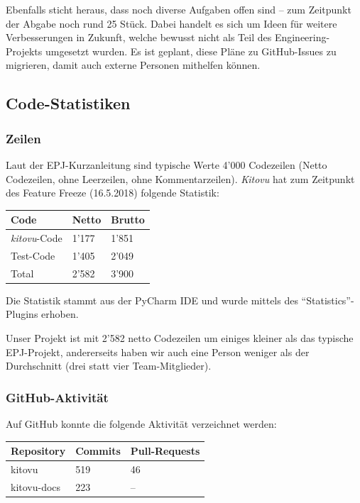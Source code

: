 \documentclass[a4paper]{article}
\begin{document}
Ebenfalls sticht heraus, dass noch diverse Aufgaben offen sind -- zum Zeitpunkt
der Abgabe noch rund 25 Stück. Dabei handelt es sich um Ideen für weitere
Verbesserungen in Zukunft, welche bewusst nicht als Teil des
Engineering-Projekts umgesetzt wurden. Es ist geplant, diese Pläne zu
GitHub-Issues zu migrieren, damit auch externe Personen mithelfen können.

\subsection{Code-Statistiken}

\subsubsection{Zeilen}

Laut der EPJ-Kurzanleitung sind typische Werte 4'000 Codezeilen (Netto Codezeilen, ohne Leerzeilen, ohne Kommentarzeilen). \emph{Kitovu} hat zum Zeitpunkt des Feature Freeze (16.5.2018) folgende Statistik:

\begin{tabulary}{\linewidth}{lll}
  \toprule
  \textbf{Code} & \textbf{Netto} & \textbf{Brutto} \\
  \midrule
  \emph{kitovu}-Code & 1'177 & 1'851 \\
  Test-Code & 1'405 & 2'049 \\
  \midrule
  Total & 2'582 & 3'900 \\
  \bottomrule
\end{tabulary}

Die Statistik stammt aus der PyCharm IDE und wurde mittels des ``Statistics''-Plugins erhoben.

Unser Projekt ist mit 2'582 netto Codezeilen um einiges kleiner als das typische EPJ-Projekt, andererseits haben wir auch eine Person weniger als der Durchschnitt (drei statt vier Team-Mitglieder).

\subsubsection{GitHub-Aktivität}

Auf GitHub konnte die folgende Aktivität verzeichnet werden:

\begin{tabulary}{\linewidth}{lll}
  \toprule
  \textbf{Repository} & \textbf{Commits} & \textbf{Pull-Requests} \\
  \midrule
  kitovu & 519 & 46 \\
  kitovu-docs & 223 & -- \\
  \bottomrule
\end{tabulary}
\end{document}
